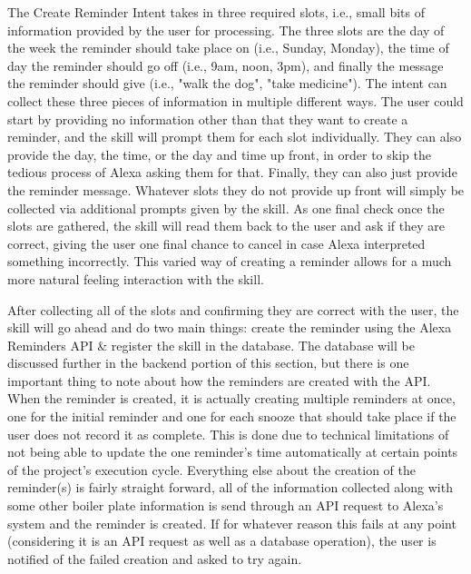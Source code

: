 \documentclass[11pt, oneside]{article}
\begin{document}
The Create Reminder Intent takes in three required slots, i.e., small bits of information provided by the user for processing. 
The three slots are the day of the week the reminder should take place on (i.e., Sunday, Monday), the time of day the reminder should go off (i.e., 9am, noon, 3pm), and finally the message the reminder should give (i.e., "walk the dog", "take medicine").
The intent can collect these three pieces of information in multiple different ways. 
The user could start by providing no information other than that they want to create a reminder, and the skill will prompt them for each slot individually. 
They can also provide the day, the time, or the day and time up front, in order to skip the tedious process of Alexa asking them for that. 
Finally, they can also just provide the reminder message. 
Whatever slots they do not provide up front will simply be collected via additional prompts given by the skill. 
As one final check once the slots are gathered, the skill will read them back to the user and ask if they are correct, giving the user one final chance to cancel in case Alexa interpreted something incorrectly. 
This varied way of creating a reminder allows for a much more natural feeling interaction with the skill. 

After collecting all of the slots and confirming they are correct with the user, the skill will go ahead and do two main things: create the reminder using the Alexa Reminders API \& register the skill in the database. 
The database will be discussed further in the backend portion of this section, but there is one important thing to note about how the reminders are created with the API. 
When the reminder is created, it is actually creating multiple reminders at once, one for the initial reminder and one for each snooze that should take place if the user does not record it as complete. 
This is done due to technical limitations of not being able to update the one reminder's time automatically at certain points of the project's execution cycle. 
Everything else about the creation of the reminder(s) is fairly straight forward, all of the information collected along with some other boiler plate information is send through an API request to Alexa's system and the reminder is created.
If for whatever reason this fails at any point (considering it is an API request as well as a database operation), the user is notified of the failed creation and asked to try again. 
\end{document}
